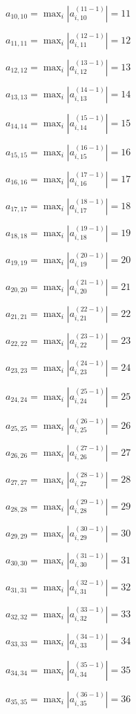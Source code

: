 \documentclass[a4paper,12pt]{article}
\begin{document}
$a _{ 10, 10 } =  \max _i |a _{ i, 10 } ^{ (11 - 1) } | = 11$

$a _{ 11, 11 } =  \max _i |a _{ i, 11 } ^{ (12 - 1) } | = 12$

$a _{ 12, 12 } =  \max _i |a _{ i, 12 } ^{ (13 - 1) } | = 13$

$a _{ 13, 13 } =  \max _i |a _{ i, 13 } ^{ (14 - 1) } | = 14$

$a _{ 14, 14 } =  \max _i |a _{ i, 14 } ^{ (15 - 1) } | = 15$

$a _{ 15, 15 } =  \max _i |a _{ i, 15 } ^{ (16 - 1) } | = 16$

$a _{ 16, 16 } =  \max _i |a _{ i, 16 } ^{ (17 - 1) } | = 17$

$a _{ 17, 17 } =  \max _i |a _{ i, 17 } ^{ (18 - 1) } | = 18$

$a _{ 18, 18 } =  \max _i |a _{ i, 18 } ^{ (19 - 1) } | = 19$

$a _{ 19, 19 } =  \max _i |a _{ i, 19 } ^{ (20 - 1) } | = 20$

$a _{ 20, 20 } =  \max _i |a _{ i, 20 } ^{ (21 - 1) } | = 21$

$a _{ 21, 21 } =  \max _i |a _{ i, 21 } ^{ (22 - 1) } | = 22$

$a _{ 22, 22 } =  \max _i |a _{ i, 22 } ^{ (23 - 1) } | = 23$

$a _{ 23, 23 } =  \max _i |a _{ i, 23 } ^{ (24 - 1) } | = 24$

$a _{ 24, 24 } =  \max _i |a _{ i, 24 } ^{ (25 - 1) } | = 25$

$a _{ 25, 25 } =  \max _i |a _{ i, 25 } ^{ (26 - 1) } | = 26$

$a _{ 26, 26 } =  \max _i |a _{ i, 26 } ^{ (27 - 1) } | = 27$

$a _{ 27, 27 } =  \max _i |a _{ i, 27 } ^{ (28 - 1) } | = 28$

$a _{ 28, 28 } =  \max _i |a _{ i, 28 } ^{ (29 - 1) } | = 29$

$a _{ 29, 29 } =  \max _i |a _{ i, 29 } ^{ (30 - 1) } | = 30$

$a _{ 30, 30 } =  \max _i |a _{ i, 30 } ^{ (31 - 1) } | = 31$

$a _{ 31, 31 } =  \max _i |a _{ i, 31 } ^{ (32 - 1) } | = 32$

$a _{ 32, 32 } =  \max _i |a _{ i, 32 } ^{ (33 - 1) } | = 33$

$a _{ 33, 33 } =  \max _i |a _{ i, 33 } ^{ (34 - 1) } | = 34$

$a _{ 34, 34 } =  \max _i |a _{ i, 34 } ^{ (35 - 1) } | = 35$

$a _{ 35, 35 } =  \max _i |a _{ i, 35 } ^{ (36 - 1) } | = 36$
\end{document}
